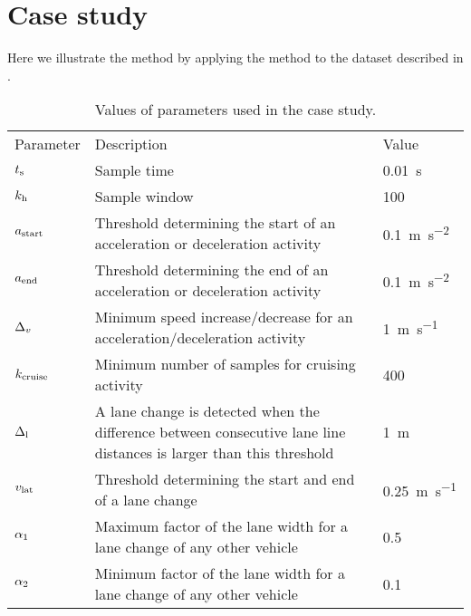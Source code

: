 \section{Case study}
\label{sec:case study}

Here we illustrate the method by applying the method to the dataset described in \autocite{paardekooper2019dataset6000km}.

\begin{table}
	\centering
	\caption{\cstartc Values of parameters used in the case study. \cendc}
	\label{tab:parameters}
	\cstartc
	\begin{tabularx}{\linewidth}{lXl}
		\toprule
		Parameter & Description & Value \\ \otoprule
		$t_\mathrm{s}$ & Sample time & \SI{0.01}{\second} \\
		$k_{\mathrm{h}}$ & Sample window & 100 \\
		$a_\mathrm{start}$ & Threshold determining the start of an acceleration or deceleration activity & \SI{0.1}{\meter\per\second\squared} \\
		$a_\mathrm{end}$ & Threshold determining the end of an acceleration or deceleration activity & \SI{0.1}{\meter\per\second\squared} \\
		$\Delta_{v}$ & Minimum speed increase/decrease for an acceleration/deceleration activity & \SI{1}{\meter\per\second} \\
		$k_\mathrm{cruise}$ & Minimum number of samples for cruising activity & 400 \\
		$\Delta_{\mathrm{l}}$ & A lane change is detected when the difference between consecutive lane line distances is larger than this threshold & \SI{1}{\meter} \\
		$v_{\mathrm{lat}}$ & Threshold determining the start and end of a lane change & \SI{0.25}{\meter\per\second} \\
		$\alpha_1$ & Maximum factor of the lane width for a lane change of any other vehicle & 0.5 \\
		$\alpha_2$ & Minimum factor of the lane width for a lane change of any other vehicle & 0.1 \\
		\bottomrule
	\end{tabularx}
	\cendc
\end{table}

